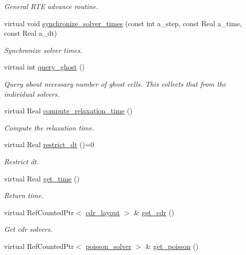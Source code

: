 \begin{DoxyCompactItemize}
\begin{DoxyCompactList}\small\item\em General R\+TE advance routine. \end{DoxyCompactList}\item 
virtual void \hyperlink{classtime__stepper_a567d04b98302f443428d465b2a0e57db}{synchronize\+\_\+solver\+\_\+times} (const int a\+\_\+step, const Real a\+\_\+time, const Real a\+\_\+dt)
\begin{DoxyCompactList}\small\item\em Synchronize solver times. \end{DoxyCompactList}\item 
virtual int \hyperlink{classtime__stepper_a41cf4b02f8e06f73c2c636d211c9602d}{query\+\_\+ghost} ()
\begin{DoxyCompactList}\small\item\em Query about necessary number of ghost cells. This collects that from the individual solvers. \end{DoxyCompactList}\item 
virtual Real \hyperlink{classtime__stepper_afcb6e29bb009384b02aa541eece52699}{compute\+\_\+relaxation\+\_\+time} ()
\begin{DoxyCompactList}\small\item\em Compute the relaxation time. \end{DoxyCompactList}\item 
virtual Real \hyperlink{classtime__stepper_a97f9bb068982c782ac06d8e83451e5b5}{restrict\+\_\+dt} ()=0
\begin{DoxyCompactList}\small\item\em Restrict dt. \end{DoxyCompactList}\item 
virtual Real \hyperlink{classtime__stepper_ac5952aa21b8023002d879e3bf2323d7c}{get\+\_\+time} ()
\begin{DoxyCompactList}\small\item\em Return time. \end{DoxyCompactList}\item 
virtual Ref\+Counted\+Ptr$<$ \hyperlink{classcdr__layout}{cdr\+\_\+layout} $>$ \& \hyperlink{classtime__stepper_ad21847354c19d435c1637a589352e3f7}{get\+\_\+cdr} ()
\begin{DoxyCompactList}\small\item\em Get cdr solvers. \end{DoxyCompactList}\item 
virtual Ref\+Counted\+Ptr$<$ \hyperlink{classpoisson__solver}{poisson\+\_\+solver} $>$ \& \hyperlink{classtime__stepper_aa3c122d919a7be5315bc191528d7f29c}{get\+\_\+poisson} ()

\end{DoxyCompactItemize}
